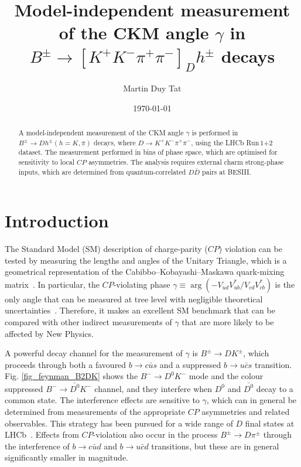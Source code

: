 \documentclass[12pt, a4paper, notitlepage, onecolumn]{article}
\title{Model-independent measurement of the CKM angle $\gamma$ in $B^\pm\to[K^+K^-\pi^+\pi^-]_Dh^\pm$ decays}
\author{Martin Duy Tat}
\date{\today}
\begin{document}
\maketitle
\begin{abstract}
\noindent A model-independent measurement of the CKM angle $\gamma$ is performed in $B^\pm\to Dh^\pm (h = K, \pi)$ decays, where $D\to K^+K^-\pi^+\pi^-$, using the LHCb Run\,$1$+$2$ dataset. The measurement performed in bins of phase space, which are optimised for sensitivity to local $C\!P$ asymmetries. The analysis requires external charm strong-phase inputs, which are determined from quantum-correlated $D\bar{D}$ pairs at BESIII.
\end{abstract}

\section{Introduction}
\noindent The Standard Model (SM) description of charge-parity ($C\!P$) violation can be tested by measuring the lengths and angles of the Unitary Triangle, which is a geometrical representation of the Cabibbo–Kobayashi–Maskawa quark-mixing matrix~\cite{Kobayashi:1973fv}. In particular, the $C\!P$-violating phase  $\gamma\equiv\arg(-V_{ud}V_{ub}^*/V_{cd}V_{cb}^*)$ is the only angle that can be measured at tree level with negligible theoretical uncertainties~\cite{Brod_2014}. Therefore, it makes an excellent SM benchmark that can be compared with other indirect measurements of $\gamma$ that are more likely to be affected by New Physics.

A powerful decay channel for the measurement of $\gamma$ is $B^\pm\to DK^\pm$, which proceeds through both a favoured $b\to c\bar{u}s$ and a suppressed $b\to u\bar{c}s$ transition. Fig. \ref{fig_feynman_B2DK} shows the $B^-\to D^0K^-$ mode and the colour suppressed $B^-\to\bar{D^0}K^-$ channel, and they interfere when $D^0$ and $\bar{D^0}$ decay to a common state. The interference effects are sensitive to $\gamma$, which can in general be determined from measurements of the appropriate $C\!P$ asymmetries and related observables. This strategy has been pursued for a wide range of $D$ final states at LHCb~\cite{LHCb-PAPER-2021-033}. Effects from $C\!P$-violation also occur in the process $B^\pm\to D\pi^\pm$ through the interference of $b\to c\bar{u}d$ and $b\to u\bar{c}d$ transitions, but these are in general significantly smaller in magnitude.
\end{document}
